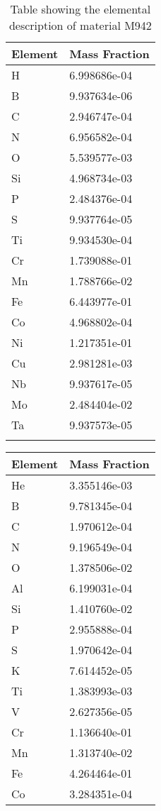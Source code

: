 \begin{centering}
\begin{longtable}[ht!]
{ p{} | p{} }
\hline
Element & Mass Fraction\\
\hline
H &  6.998686e-04\\
B &  9.937634e-06\\
C &  2.946747e-04\\
N &  6.956582e-04\\
O &  5.539577e-03\\
Si &  4.968734e-03\\
P &  2.484376e-04\\
S &  9.937764e-05\\
Ti &  9.934530e-04\\
Cr &  1.739088e-01\\
Mn &  1.788766e-02\\
Fe &  6.443977e-01\\
Co &  4.968802e-04\\
Ni &  1.217351e-01\\
Cu &  2.981281e-03\\
Nb &  9.937617e-05\\
Mo &  2.484404e-02\\
Ta &  9.937573e-05\\
\caption{Table showing the elemental description of material M942}
\label{table:material_EPP3L}
\end{longtable}
\clearpage
\begin{longtable}[ht!]
  { p{} | p{} }
\hline
Element & Mass Fraction\\
\hline
He &  3.355146e-03\\
B &  9.781345e-04\\
C &  1.970612e-04\\
N &  9.196549e-04\\
O &  1.378506e-02\\
Al &  6.199031e-04\\
Si &  1.410760e-02\\
P &  2.955888e-04\\
S &  1.970642e-04\\
K &  7.614452e-05\\
Ti &  1.383993e-03\\
V &  2.627356e-05\\
Cr &  1.136640e-01\\
Mn &  1.313740e-02\\
Fe &  4.264464e-01\\
Co &  3.284351e-04\\

\end{longtable}
\end{centering}
